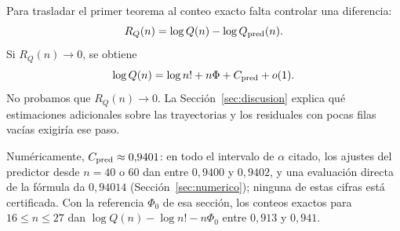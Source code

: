 Para trasladar el primer teorema al conteo exacto falta controlar una diferencia:
\[
 R_Q(n)=\log Q(n)-\log Q_{\rm pred}(n).
\]
Si $R_Q(n)\to0$, se obtiene
\[
 \log Q(n)=\log n!+n\Phi+C_{\rm pred}+o(1).
\]
No probamos que $R_Q(n)\to0$. La Sección~\ref{sec:discusion} explica qué estimaciones adicionales
sobre las trayectorias y los residuales con pocas filas vacías exigiría ese paso.

Numéricamente, $C_{\rm pred}\approx0{,}9401$: en todo el intervalo de $\alpha$ citado, los ajustes del
predictor desde $n=40$ o $60$ dan entre $0{,}9400$ y $0{,}9402$, y una evaluación directa de la fórmula da
$0{,}94014$ (Sección~\ref{sec:numerico}); ninguna de estas cifras está certificada.
Con la referencia $\Phi_0$ de esa sección, los conteos exactos para $16\le n\le27$ dan
$\log Q(n)-\log n!-n\Phi_0$ entre $0{,}913$ y $0{,}941$.
